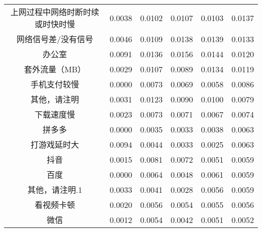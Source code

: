 \documentclass{MathorCupmodeling}
\begin{document}
\begin{table}[htbp]
{\begin{tabular}{c|cccc|c}
		  上网过程中网络时断时续或时快时慢 & 0.0038  & 0.0102  & 0.0107  & 0.0103  & 0.0137  \\
		  网络信号差/没有信号 & 0.0046  & 0.0109  & 0.0138  & 0.0139  & 0.0133  \\
		  办公室   & 0.0091  & 0.0136  & 0.0156  & 0.0144  & 0.0120  \\
		  套外流量（MB） & 0.0029  & 0.0107  & 0.0089  & 0.0134  & 0.0119  \\
		  手机支付较慢 & 0.0000  & 0.0073  & 0.0069  & 0.0058  & 0.0086  \\
		  其他，请注明 & 0.0031  & 0.0123  & 0.0090  & 0.0100  & 0.0079  \\
		  下载速度慢 & 0.0023  & 0.0073  & 0.0071  & 0.0067  & 0.0074  \\
		  拼多多   & 0.0000  & 0.0035  & 0.0033  & 0.0038  & 0.0063  \\
		  打游戏延时大 & 0.0094  & 0.0044  & 0.0033  & 0.0025  & 0.0063  \\
		  抖音    & 0.0015  & 0.0081  & 0.0072  & 0.0051  & 0.0059  \\
		  百度    & 0.0000  & 0.0064  & 0.0048  & 0.0061  & 0.0059  \\
		  其他，请注明.1 & 0.0033  & 0.0041  & 0.0028  & 0.0056  & 0.0059  \\
		  看视频卡顿 & 0.0020  & 0.0056  & 0.0054  & 0.0055  & 0.0056  \\
		  微信    & 0.0012  & 0.0054  & 0.0042  & 0.0051  & 0.0052  \\
		  \bottomrule
		  \end{tabular}}
		\label{tab:上网业务影响因素量化1}
	\end{table}
\end{document}

